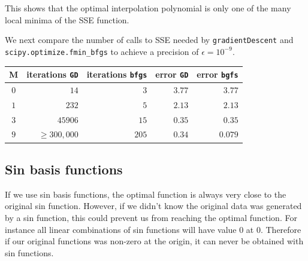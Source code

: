 This shows that the optimal interpolation polynomial is only one of the many local minima of the SSE function.

We next compare the number of calls to SSE needed by {\tt gradientDescent} and {\tt scipy.optimize.fmin\_bfgs} to achieve a precision of $\epsilon = 10^{-9}$.
\begin{center}
  \begin{tabular}{| c  | r |r |r |r |}
    \hline
 M & iterations {\tt GD} & iterations  {\tt bfgs} & error {\tt GD} & error  {\tt bgfs}  \\ \hline
 $0$ & $14$  & $3$ & $3.77$ & $3.77$ \\ \hline
 $1$ & $232$ &$5$ & $2.13$ & $2.13$ \\ \hline
 $3$ & $45906$ & $15$ & $0.35$ & $0.35$\\ \hline
  $9$ & $\geq 300,000$ &  $205$ & $0.34$ & $0.079$ \\
    \hline
  \end{tabular}
\end{center}


\subsection{Sin basis functions}
If we use sin basis functions, the optimal function is always very close to the original sin function. However, if we didn't know the original data was generated by a sin function, this could prevent us from reaching the optimal function. For instance all linear combinations of sin functions will have value 0 at 0. Therefore if our original functions was non-zero at the origin, it can never be obtained with sin functions.